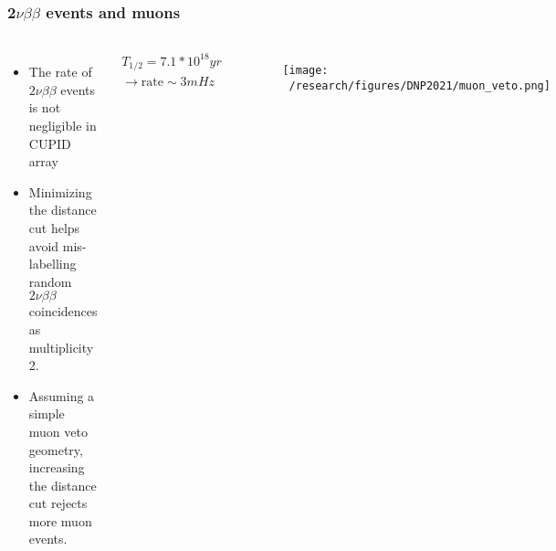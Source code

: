 \documentclass{beamer}
\begin{document}
	

	\begin{frame}
		\frametitle{2$\nu\beta\beta$ events and muons}
		\begin{columns}[c] %
			
			\begin{itemize}
				\setlength\itemsep{2em}				
				\item The rate of $2\nu\beta\beta$ events is not negligible in CUPID array
				\item Minimizing the distance cut helps avoid mis-labelling random $2\nu\beta\beta$ coincidences as multiplicity 2.
				\item Assuming a simple muon veto geometry, increasing the distance cut rejects more muon events.
			\end{itemize}
			
			\begin{eqnarray*}
			T_{1/2} = 7.1* 10^{18} yr \\ 
			\rightarrow \text{rate} \sim 3mHz
			\end{eqnarray*}			
			
			\begin{figure}
			\texttt{[image: ~/research/figures/DNP2021/muon\_veto.png]}
			\end{figure}
			
		\end{columns}
	\end{frame}


\end{document}
